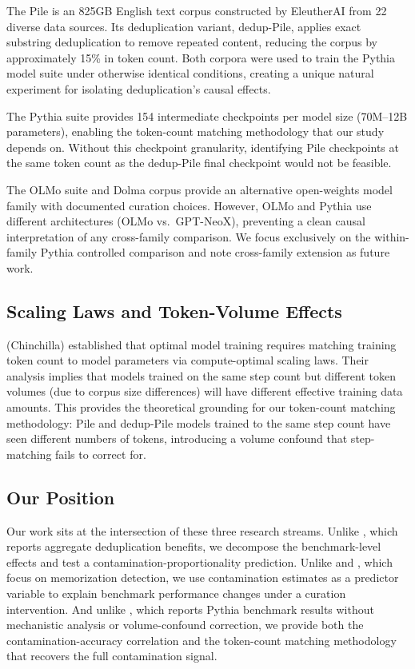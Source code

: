 The Pile \citep{Gao2020Pile} is an 825GB English text corpus constructed by EleutherAI
from 22 diverse data sources. Its deduplication variant, dedup-Pile, applies exact
substring deduplication to remove repeated content, reducing the corpus by approximately
15\% in token count. Both corpora were used to train the Pythia model suite
\citep{Biderman2023Pythia} under otherwise identical conditions, creating a unique
natural experiment for isolating deduplication's causal effects.

The Pythia suite provides 154 intermediate checkpoints per model size (70M--12B
parameters), enabling the token-count matching methodology that our study depends on.
Without this checkpoint granularity, identifying Pile checkpoints at the same token count
as the dedup-Pile final checkpoint would not be feasible.

The OLMo suite \citep{Groeneveld2024OLMo} and Dolma corpus \citep{Soldaini2024Dolma} provide
an alternative open-weights model family with documented curation choices. However, OLMo
and Pythia use different architectures (OLMo vs.\ GPT-NeoX), preventing a clean causal
interpretation of any cross-family comparison. We focus exclusively on the within-family
Pythia controlled comparison and note cross-family extension as future work.

\subsection{Scaling Laws and Token-Volume Effects}

\citet{Hoffmann2022Training} (Chinchilla) established that optimal model training requires
matching training token count to model parameters via compute-optimal scaling laws.
Their analysis implies that models trained on the same step count but different token
volumes (due to corpus size differences) will have different effective training data
amounts. This provides the theoretical grounding for our token-count matching
methodology: Pile and dedup-Pile models trained to the same step count have seen
different numbers of tokens, introducing a volume confound that step-matching fails to correct for.

\subsection{Our Position}

Our work sits at the intersection of these three research streams. Unlike \citet{Lee2022Deduplicating},
which reports aggregate deduplication benefits, we decompose the benchmark-level
effects and test a contamination-proportionality prediction. Unlike \citet{Shi2023Detecting}
and \citet{Carlini2021Extracting}, which focus on memorization detection, we use contamination
estimates as a predictor variable to explain benchmark performance changes under a
curation intervention. And unlike \citet{Biderman2023Pythia}, which reports Pythia
benchmark results without mechanistic analysis or volume-confound correction, we
provide both the contamination-accuracy correlation and the token-count matching
methodology that recovers the full contamination signal.
